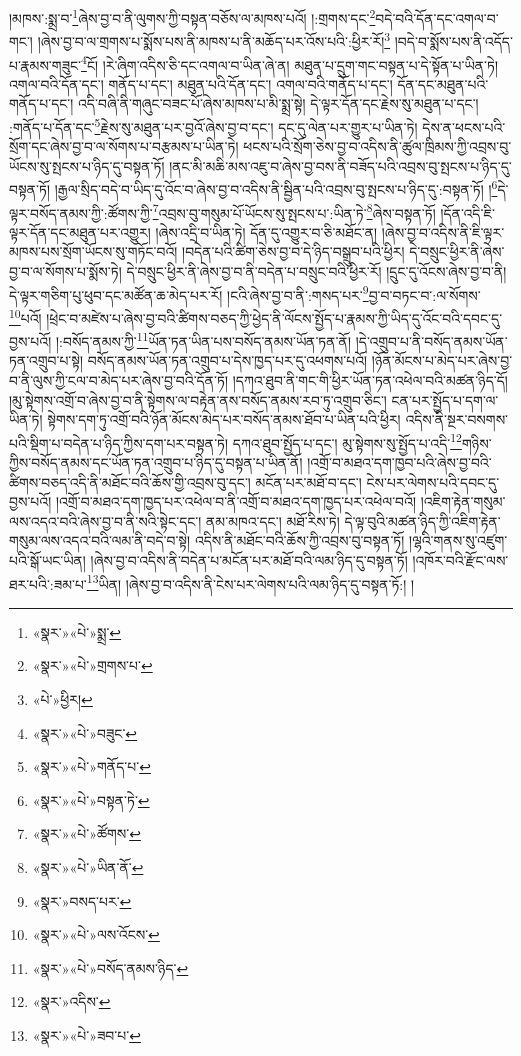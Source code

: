 །མཁས་:སྨྲ་བ་\footnote{«སྣར་»«པེ་»སྨྲ་}ཞེས་བྱ་བ་ནི་ལུགས་ཀྱི་བསྟན་བཅོས་ལ་མཁས་པའོ། །:གྲགས་དང་\footnote{«སྣར་»«པེ་»གྲགས་པ་}བདེ་བའི་དོན་དང་འགལ་བ་གང་། །ཞེས་བྱ་བ་ལ་གྲགས་པ་སྨོས་པས་ནི་མཁས་པ་ནི་མཆོད་པར་འོས་པའི་:ཕྱིར་རོ།\footnote{«པེ་»ཕྱིར།} །བདེ་བ་སྨོས་པས་ནི་འདོད་པ་རྣམས་གཟུང་\footnote{«སྣར་»«པེ་»བཟུང་}ངོ། །རེ་ཞིག་འདིས་ཅི་དང་འགལ་བ་ཡིན་ཞེ་ན། མཐུན་པ་དྲུག་གང་བསྟན་པ་དེ་སྟོན་པ་ཡིན་ཏེ། འགལ་བའི་དོན་དང་། གནོད་པ་དང་། མཐུན་པའི་དོན་དང་། འགལ་བའི་གནོད་པ་དང་། དོན་དང་མཐུན་པའི་གནོད་པ་དང་། འདི་བཞི་ནི་གཞུང་བཟང་པོ་ཞེས་མཁས་པ་མི་སྨྲ་སྟེ། དེ་ལྟར་དོན་དང་རྗེས་སུ་མཐུན་པ་དང་། :གནོད་པ་དོན་དང་\footnote{«སྣར་»«པེ་»གནོད་པ་}རྗེས་སུ་མཐུན་པར་བྱའོ་ཞེས་བྱ་བ་དང་། དང་དུ་ལེན་པར་གྱུར་པ་ཡིན་ཏེ། དེས་ན་ཕངས་པའི་སྲོག་དང་ཞེས་བྱ་བ་ལ་སོགས་པ་བརྩམས་པ་ཡིན་ཏེ། ཕངས་པའི་སྲོག་ཅེས་བྱ་བ་འདིས་ནི་ཚུལ་ཁྲིམས་ཀྱི་འབྲས་བུ་ཡོངས་སུ་སྤངས་པ་ཉིད་དུ་བསྟན་ཏོ། །ནང་མི་མཆི་མས་འཇུ་བ་ཞེས་བྱ་བས་ནི་བཟོད་པའི་འབྲས་བུ་སྤངས་པ་ཉིད་དུ་བསྟན་ཏོ། །རྒྱལ་སྲིད་བདེ་བ་ཡིད་དུ་འོང་བ་ཞེས་བྱ་བ་འདིས་ནི་སྦྱིན་པའི་འབྲས་བུ་སྤངས་པ་ཉིད་དུ་:བསྟན་ཏོ། །\footnote{«སྣར་»«པེ་»བསྟན་ཏེ་}དེ་ལྟར་བསོད་ནམས་ཀྱི་:ཚོགས་ཀྱི་\footnote{«སྣར་»«པེ་»ཚོགས་}འབྲས་བུ་གསུམ་པོ་ཡོངས་སུ་སྤངས་པ་:ཡིན་ཏེ་\footnote{«སྣར་»«པེ་»ཡིན་ནོ་}ཞེས་བསྟན་ཏོ། །དོན་འདི་ཇི་ལྟར་དོན་དང་མཐུན་པར་འགྱུར། །ཞེས་འདྲི་བ་ཡིན་ཏེ། དོན་དུ་འགྱུར་བ་ཅི་མཐོང་ན། །ཞེས་བྱ་བ་འདིས་ནི་ཇི་ལྟར་མཁས་པས་སྲོག་ཡོངས་སུ་གཏོང་བའོ། །བདེན་པའི་ཚིག་ཅེས་བྱ་བ་དེ་ཉིད་བསྒྲུབ་པའི་ཕྱིར། དེ་བསྲུང་ཕྱིར་ནི་ཞེས་བྱ་བ་ལ་སོགས་པ་སྨོས་ཏེ། དེ་བསྲུང་ཕྱིར་ནི་ཞེས་བྱ་བ་ནི་བདེན་པ་བསྲུང་བའི་ཕྱིར་རོ། །དྲུང་དུ་འོངས་ཞེས་བྱ་བ་ནི། དེ་ལྟར་གཅིག་པུ་ཕུབ་དང་མཚོན་ཆ་མེད་པར་རོ། །ངའི་ཞེས་བྱ་བ་ནི་:གསད་པར་\footnote{«སྣར་»བསད་པར་}བྱ་བ་བཏང་བ་:ལ་སོགས་\footnote{«སྣར་»«པེ་»ལས་འོངས་}པའོ། །ཕྲེང་བ་མཛེས་པ་ཞེས་བྱ་བའི་ཚིགས་བཅད་ཀྱི་ཕྱེད་ནི་ལོངས་སྤྱོད་པ་རྣམས་ཀྱི་ཡིད་དུ་འོང་བའི་དབང་དུ་བྱས་པའོ། །:བསོད་ནམས་ཀྱི་\footnote{«སྣར་»«པེ་»བསོད་ནམས་ཉིད་}ཡོན་ཏན་ཡིན་པས་བསོད་ནམས་ཡོན་ཏན་ནོ། །དེ་འགྲུབ་པ་ནི་བསོད་ནམས་ཡོན་ཏན་འགྲུབ་པ་སྟེ། བསོད་ནམས་ཡོན་ཏན་འགྲུབ་པ་དེས་ཁྱད་པར་དུ་འཕགས་པའོ། །ཉོན་མོངས་པ་མེད་པར་ཞེས་བྱ་བ་ནི་ལུས་ཀྱི་ངལ་བ་མེད་པར་ཞེས་བྱ་བའི་དོན་ཏོ། །དཀའ་ཐུབ་ནི་གང་གི་ཕྱིར་ཡོན་ཏན་འཕེལ་བའི་མཚན་ཉིད་དོ། །མུ་སྟེགས་འགྲོ་བ་ཞེས་བྱ་བ་ནི་སྟེགས་ལ་བརྟེན་ནས་བསོད་ནམས་རབ་ཏུ་འགྲུབ་ཅིང་། ངན་པར་སྤྱོད་པ་དག་ལ་ཡིན་ཏེ། སྟེགས་དག་ཏུ་འགྲོ་བའི་ཉོན་མོངས་མེད་པར་བསོད་ནམས་ཐོབ་པ་ཡིན་པའི་ཕྱིར། འདིས་ནི་སྔར་བསགས་པའི་སྡིག་པ་བདེན་པ་ཉིད་ཀྱིས་དག་པར་བསྟན་ཏེ། དཀའ་ཐུབ་སྤྱོད་པ་དང་། མུ་སྟེགས་སུ་སྤྱོད་པ་འདི་\footnote{«སྣར་»འདིས་}གཉིས་ཀྱིས་བསོད་ནམས་དང་ཡོན་ཏན་འགྲུབ་པ་ཉིད་དུ་བསྟན་པ་ཡིན་ནོ། །འགྲོ་བ་མཐའ་དག་ཁྱབ་པའི་ཞེས་བྱ་བའི་ཚིགས་བཅད་འདི་ནི་མཐོང་བའི་ཆོས་གྱི་འབྲས་བུ་དང་། མངོན་པར་མཐོ་བ་དང་། ངེས་པར་ལེགས་པའི་དབང་དུ་བྱས་པའོ། །འགྲོ་བ་མཐའ་དག་ཁྱད་པར་འཕེལ་བ་ནི་འགྲོ་བ་མཐའ་དག་ཁྱད་པར་འཕེལ་བའོ། །འཇིག་རྟེན་གསུམ་ལས་འདའ་བའི་ཞེས་བྱ་བ་ནི་སའི་སྟེང་དང་། ནམ་མཁའ་དང་། མཐོ་རིས་ཏེ། དེ་ལྟ་བུའི་མཚན་ཉིད་ཀྱི་འཇིག་རྟེན་གསུམ་ལས་འདའ་བའི་ལམ་ནི་བདེ་བ་སྟེ། འདིས་ནི་མཐོང་བའི་ཆོས་ཀྱི་འབྲས་བུ་བསྟན་ཏོ། །ལྷའི་གནས་སུ་འཛུག་པའི་སྒོ་ཡང་ཡིན། །ཞེས་བྱ་བ་འདིས་ནི་བདེན་པ་མངོན་པར་མཐོ་བའི་ལམ་ཉིད་དུ་བསྟན་ཏོ། །འཁོར་བའི་རྫོང་ལས་ཐར་པའི་:ཟམ་པ་\footnote{«སྣར་»«པེ་»ཟབ་པ་}ཡིན། །ཞེས་བྱ་བ་འདིས་ནི་ངེས་པར་ལེགས་པའི་ལམ་ཉིད་དུ་བསྟན་ཏོ:། །
